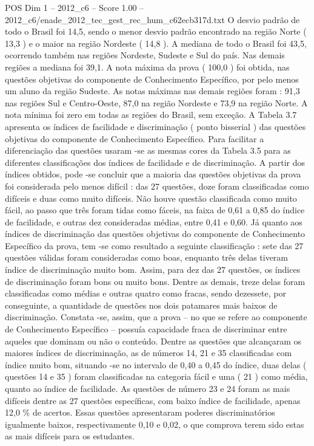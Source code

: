 \begin{textsample}{POS Dim 1 – 2012\_c6 – Score 1.00 – 2012\_c6/enade\_2012\_tec\_gest\_rec\_hum\_c62ecb317d.txt}
O desvio padrão de todo o Brasil foi 14,5, sendo o menor desvio padrão encontrado na região Norte ( 13,3 ) e o maior na região Nordeste ( 14,8 ).
A mediana de todo o Brasil foi 43,5, ocorrendo também nas regiões Nordeste, Sudeste e Sul do país.
Nas demais regiões a mediana foi 39,1.
A nota máxima da prova ( 100,0 ) foi obtida, nas questões objetivas do componente de Conhecimento Específico, por pelo menos um aluno da região Sudeste.
As notas máximas nas demais regiões foram : 91,3 nas regiões Sul e Centro-Oeste, 87,0 na região Nordeste e 73,9 na região Norte.
A nota mínima foi zero em todas as regiões do Brasil, sem exceção.
A Tabela 3.7 apresenta os índices de facilidade e discriminação ( ponto bisserial ) das questões objetivas do componente de Conhecimento Específico.
Para facilitar a diferenciação das questões usaram -se as mesmas cores da Tabela 3.5 para as diferentes classificações dos índices de facilidade e de discriminação.
A partir dos índices obtidos, pode -se concluir que a maioria das questões objetivas da prova foi considerada pelo menos difícil : das 27 questões, doze foram classificadas como difíceis e duas como muito difíceis.
Não houve questão classificada como muito fácil, ao passo que três foram tidas como fáceis, na faixa de 0,61 a 0,85 do índice de facilidade, e outras dez consideradas médias, entre 0,41 e 0,60.
Já quanto aos índices de discriminação das questões objetivas do componente de Conhecimento Específico da prova, tem -se como resultado a seguinte classificação : sete das 27 questões válidas foram consideradas como boas, enquanto três delas tiveram índice de discriminação muito bom.
Assim, para dez das 27 questões, os índices de discriminação foram bons ou muito bons.
Dentre as demais, treze delas foram classificadas como médias e outras quatro como fracas, sendo dezessete, por conseguinte, a quantidade de questões nos dois patamares mais baixos de discriminação.
Constata -se, assim, que a prova – no que se refere ao componente de Conhecimento Específico – possuía capacidade fraca de discriminar entre aqueles que dominam ou não o conteúdo.
Dentre as questões que alcançaram os maiores índices de discriminação, as de números 14, 21 e 35 classificadas com índice muito bom, situando -se no intervalo de 0,40 a 0,45 do índice, duas delas ( questões 14 e 35 ) foram classificadas na categoria fácil e uma ( 21 ) como média, quanto ao índice de facilidade.
As questões de número 23 e 24 foram as mais difíceis dentre as 27 questões específicas, com baixo índice de facilidade, apenas 12,0 \% de acertos.
Essas questões apresentaram poderes discriminatórios igualmente baixos, respectivamente 0,10 e 0,02, o que comprova terem sido estas as mais difíceis para os estudantes.

\end{textsample}
